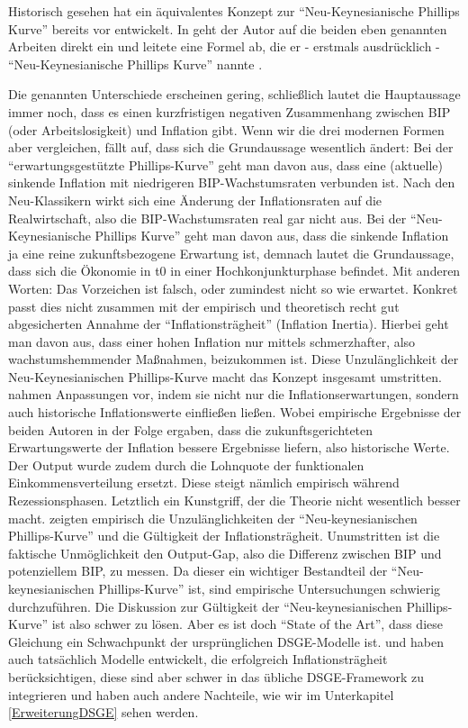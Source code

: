 Historisch gesehen hat \textcite{Rotemberg1982} ein äquivalentes Konzept zur "`Neu-Keynesianische Phillips Kurve"' bereits vor \textcite{Calvo1983} entwickelt. In \textcite{Roberts1995} geht der Autor auf die beiden eben genannten Arbeiten direkt ein und leitete eine Formel ab, die er - erstmals ausdrücklich - "`Neu-Keynesianische Phillips Kurve"' nannte \parencite[S. 979]{Roberts1995}. 

Die genannten Unterschiede erscheinen gering, schließlich lautet die Hauptaussage immer noch, dass es einen kurzfristigen negativen Zusammenhang zwischen BIP (oder Arbeitslosigkeit) und Inflation gibt. Wenn wir die drei modernen Formen aber vergleichen, fällt auf, dass sich die Grundaussage wesentlich ändert: Bei der "`erwartungsgestützte Phillips-Kurve"' geht man davon aus, dass eine (aktuelle) sinkende Inflation mit niedrigeren BIP-Wachstumsraten verbunden ist. Nach den Neu-Klassikern wirkt sich eine Änderung der Inflationsraten auf die Realwirtschaft, also die BIP-Wachstumsraten real gar nicht aus. Bei der "`Neu-Keynesianische Phillips Kurve"' geht man davon aus, dass die sinkende Inflation ja eine reine zukunftsbezogene Erwartung ist, demnach lautet die Grundaussage, dass sich die Ökonomie in t0 in einer Hochkonjunkturphase befindet. Mit anderen Worten: Das Vorzeichen ist falsch, oder zumindest nicht so wie erwartet. Konkret passt dies nicht zusammen mit der empirisch und theoretisch recht gut abgesicherten Annahme der "`Inflationsträgheit"' (Inflation Inertia). Hierbei geht man davon aus, dass einer hohen Inflation nur mittels schmerzhafter, also wachstumshemmender Maßnahmen, beizukommen ist.
Diese Unzulänglichkeit der Neu-Keynesianischen Phillips-Kurve macht das Konzept insgesamt umstritten. \textcite{Gali1999} nahmen Anpassungen vor, indem sie nicht nur die Inflationserwartungen, sondern auch historische Inflationswerte einfließen ließen. Wobei empirische Ergebnisse der beiden Autoren in der Folge ergaben, dass die zukunftsgerichteten Erwartungswerte der Inflation bessere Ergebnisse liefern, also historische Werte. Der Output wurde zudem durch die Lohnquote der funktionalen Einkommensverteilung ersetzt. Diese steigt nämlich empirisch während Rezessionsphasen. Letztlich ein Kunstgriff, der die Theorie nicht wesentlich besser macht. \textcite{Rudd2005, Rudd2006} zeigten empirisch die Unzulänglichkeiten der "`Neu-keynesianischen Phillips-Kurve"' und die Gültigkeit der Inflationsträgheit. Unumstritten ist die faktische Unmöglichkeit den Output-Gap, also die Differenz zwischen BIP und potenziellem BIP, zu messen. Da dieser ein wichtiger Bestandteil der "`Neu-keynesianischen Phillips-Kurve"' ist, sind empirische Untersuchungen schwierig durchzuführen. Die Diskussion zur Gültigkeit der "`Neu-keynesianischen Phillips-Kurve"' ist also schwer zu lösen. Aber es ist doch "`State of the Art"', dass diese Gleichung ein Schwachpunkt der ursprünglichen DSGE-Modelle ist. \textcite{Mankiw2002} und \textcite{Christiano2005} haben auch tatsächlich Modelle entwickelt, die erfolgreich Inflationsträgheit berücksichtigen, diese sind aber schwer in das übliche DSGE-Framework zu integrieren und haben auch andere Nachteile, wie wir im Unterkapitel \ref{ErweiterungDSGE} sehen werden. 

